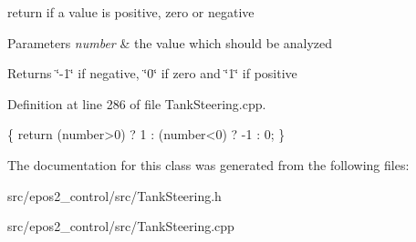 return if a value is positive, zero or negative 


\begin{DoxyParams}{Parameters}
{\em number} & the value which should be analyzed \\
\hline
\end{DoxyParams}
\begin{DoxyReturn}{Returns}
\char`\"{}-\/1\char`\"{} if negative, \char`\"{}0\char`\"{} if zero and \char`\"{}1\char`\"{} if positive 
\end{DoxyReturn}


Definition at line 286 of file Tank\-Steering.\-cpp.


\begin{DoxyCode}
\{
    \textcolor{keywordflow}{return} (number>0) ? 1 : (number<0) ? -1 : 0;
\}
\end{DoxyCode}


The documentation for this class was generated from the following files\-:\begin{DoxyCompactItemize}
\item 
src/epos2\-\_\-control/src/Tank\-Steering.\-h\item 
src/epos2\-\_\-control/src/Tank\-Steering.\-cpp\end{DoxyCompactItemize}
